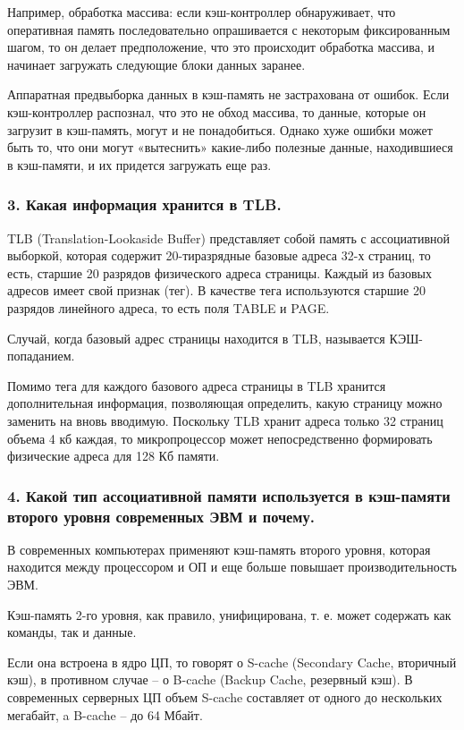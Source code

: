 Например, обработка массива: если кэш-контроллер обнаруживает, что оперативная память последовательно опрашивается с некоторым фиксированным шагом, то он делает предположение, что это происходит обработка массива, и начинает загружать следующие блоки данных заранее.

Аппаратная предвыборка данных в кэш-память не застрахована от ошибок. Если кэш-контроллер распознал, что это не обход массива, то данные, которые он загрузит в кэш-память, могут и не понадобиться. Однако хуже ошибки может быть то, что они могут «вытеснить» какие-либо полезные данные, находившиеся в кэш-памяти, и их придется загружать еще раз. 

\subsubsection{\textbf{3. Какая информация хранится в TLB.}}
TLB (Translation-Lookaside Buffer) представляет собой память с ассоциативной выборкой, которая содержит 20-тиразрядные базовые адреса 32-х страниц, то есть, старшие 20 разрядов физического адреса страницы. Каждый из базовых адресов имеет свой признак (тег). В качестве тега используются старшие 20 разрядов линейного адреса, то есть поля TABLE и PAGE.

Случай, когда базовый адрес страницы находится в TLB, называется КЭШ-попаданием. 

Помимо тега для каждого базового адреса страницы в TLB хранится дополнительная информация, позволяющая определить, какую страницу можно заменить на вновь вводимую. Поскольку TLB хранит адреса только 32 страниц объема 4 кб каждая, то микропроцессор может непосредственно формировать физические адреса для 128 Кб памяти.

\subsubsection{\textbf{4. Какой тип ассоциативной памяти используется в кэш-памяти второго уровня современных ЭВМ и почему.}}

В современных компьютерах применяют кэш-память второго уровня, которая находится между процессором и ОП и еще больше повышает производительность ЭВМ.

Кэш-память 2-го уровня, как правило, унифицирована, т. е. может содержать как команды, так и данные.

Если она встроена в ядро ЦП, то говорят о S-cache (Secondary Cache, вторичный кэш), в противном случае -- о B-cache (Backup Cache, резервный кэш). В современных серверных ЦП объем S-cache составляет от одного до нескольких мегабайт, a B-cache -- до 64 Мбайт. 

